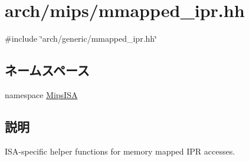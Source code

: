 \hypertarget{mips_2mmapped__ipr_8hh}{
\section{arch/mips/mmapped\_\-ipr.hh}
\label{mips_2mmapped__ipr_8hh}
}
{\ttfamily \#include \char`\"{}arch/generic/mmapped\_\-ipr.hh\char`\"{}}\par
\subsection*{ネームスペース}
\begin{DoxyCompactItemize}
\item 
namespace \hyperlink{namespaceMipsISA}{MipsISA}
\end{DoxyCompactItemize}


\subsection{説明}
ISA-\/specific helper functions for memory mapped IPR accesses. 